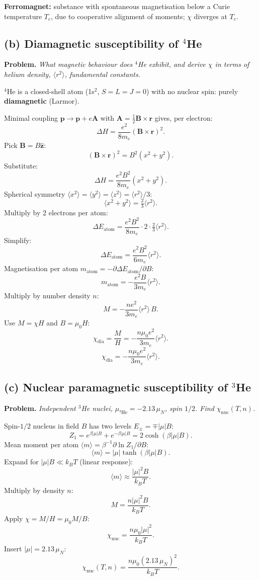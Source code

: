 \documentclass[11pt]{article}
\begin{document}
\textbf{Ferromagnet:} substance with spontaneous magnetisation below a Curie temperature $T_c$, due to cooperative alignment of moments; $\chi$ diverges at $T_c$.

\subsection*{(b) Diamagnetic susceptibility of $^4$He}

\textbf{Problem.} \emph{What magnetic behaviour does $^4$He exhibit, and derive $\chi$ in terms of helium density, $\langle r^2\rangle$, fundamental constants.}

$^4$He is a closed-shell atom (1s$^2$, $S=L=J=0$) with no nuclear spin: purely \textbf{diamagnetic} (Larmor).

Minimal coupling $\bm p\to\bm p+e\bm A$ with $\bm A=\tfrac12\bm B\times\bm r$ gives, per electron:
\[
\Delta H = \frac{e^2}{8m_e}(\bm B\times\bm r)^2.
\]
Pick $\bm B=B\hat{\bm z}$:
\[
(\bm B\times\bm r)^2 = B^2(x^2+y^2).
\]
Substitute:
\[
\Delta H = \frac{e^2 B^2}{8m_e}(x^2+y^2).
\]
Spherical symmetry $\langle x^2\rangle=\langle y^2\rangle=\langle z^2\rangle=\langle r^2\rangle/3$:
\[
\langle x^2+y^2\rangle = \tfrac23\langle r^2\rangle.
\]
Multiply by 2 electrons per atom:
\[
\Delta E_{\text{atom}} = \frac{e^2 B^2}{8m_e}\cdot 2\cdot\tfrac23\langle r^2\rangle.
\]
Simplify:
\[
\Delta E_{\text{atom}} = \frac{e^2 B^2}{6 m_e}\langle r^2\rangle.
\]
Magnetisation per atom $m_{\text{atom}} = -\partial \Delta E_{\text{atom}}/\partial B$:
\[
m_{\text{atom}} = -\frac{e^2 B}{3m_e}\langle r^2\rangle.
\]
Multiply by number density $n$:
\[
M = -\frac{n e^2}{3m_e}\langle r^2\rangle\, B.
\]
Use $M=\chi H$ and $B=\mu_0 H$:
\[
\chi_{\text{dia}} = \frac{M}{H} = -\frac{n\mu_0 e^2}{3 m_e}\langle r^2\rangle.
\]
\[
\boxed{\;\chi_{\text{dia}} = -\frac{n\mu_0 e^2}{3 m_e}\langle r^2\rangle.\;}
\]

\subsection*{(c) Nuclear paramagnetic susceptibility of $^3$He}

\textbf{Problem.} \emph{Independent $^3$He nuclei, $\mu_{^3\text{He}}=-2.13\,\mu_N$, spin $1/2$. Find $\chi_{\text{nuc}}(T,n)$.}

Spin-$1/2$ nucleus in field $B$ has two levels $E_\pm = \mp |\mu| B$:
\[
Z_1 = e^{\beta|\mu| B} + e^{-\beta|\mu| B} = 2\cosh(\beta|\mu| B).
\]
Mean moment per atom $\langle m\rangle = \beta^{-1}\partial\ln Z_1/\partial B$:
\[
\langle m\rangle = |\mu|\tanh(\beta|\mu| B).
\]
Expand for $|\mu| B \ll k_B T$ (linear response):
\[
\langle m\rangle \approx \frac{|\mu|^2 B}{k_B T}.
\]
Multiply by density $n$:
\[
M = \frac{n|\mu|^2 B}{k_B T}.
\]
Apply $\chi = M/H = \mu_0 M/B$:
\[
\chi_{\text{nuc}} = \frac{n\mu_0 |\mu|^2}{k_B T}.
\]
Insert $|\mu| = 2.13\,\mu_N$:
\[
\boxed{\;\chi_{\text{nuc}}(T,n) = \frac{n\mu_0 (2.13\,\mu_N)^2}{k_B T}.\;}
\]
\end{document}
